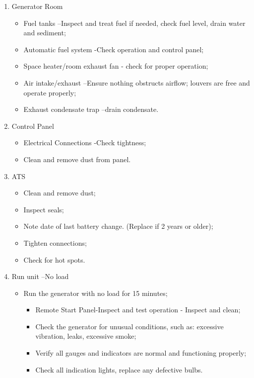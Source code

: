 \begin{enumerate}[label=(\alph*)]
\item Generator Room
\begin{itemize}
	\item Fuel tanks –Inspect and treat fuel if needed, check fuel level, drain water and sediment;
	\item Automatic fuel system -Check operation and control panel;
	\item Space heater/room exhaust fan - check for proper operation;
	\item Air intake/exhaust –Ensure nothing obstructs airflow; louvers are free and operate properly;
	\item Exhaust condensate trap –drain condensate.
\end{itemize}

\item Control Panel
\begin{itemize}
	\item Electrical Connections -Check tightness;
	\item Clean and remove dust from panel.
\end{itemize}


\item ATS
\begin{itemize}
	\item Clean and remove dust;
	\item Inspect seals;
	\item Note date of last battery change.  (Replace if 2 years or older);
	\item Tighten connections;
	\item Check for hot spots.
\end{itemize}

\item Run unit –No load
\begin{itemize}
	\item Run the generator with no load for 15 minutes;
	\begin{itemize}
		\item Remote Start Panel-Inspect and test operation - Inspect and clean; 
		\item Check the generator for unusual conditions, such as: excessive vibration, leaks, excessive smoke;
		\item Verify all gauges and indicators are normal and functioning properly; 
		\item Check all indication lights, replace any defective bulbs.
	\end{itemize}
\end{itemize}


\end{enumerate}

